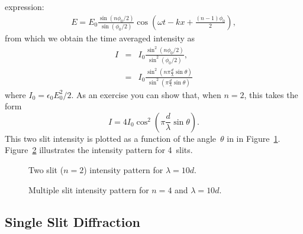 expression:
\begin{eqnarray*}
E = E_0 \frac{\sin (n\phi_0/2)}{\sin (\phi_0/2)}
        \cos\left(\omega t - k x + \frac{(n-1)\phi_0}{2}\right), 
\end{eqnarray*}
from which we obtain the time averaged intensity as
\begin{eqnarray*}
I & = & I_0 \frac{\sin^2 (n\phi_0/2)}{\sin^2 (\phi_0/2)},\\
  & = & I_0 \frac{\sin^2 \left(n \pi \frac{d}{\lambda} \sin \theta\right)}
                 {\sin^2 \left(  \pi \frac{d}{\lambda} \sin \theta\right)}
\end{eqnarray*}
where $I_0 = \epsilon_0 E_0^2/2$. As an exercise you can show that, when $n=2$,
this takes the form
$$I=4I_0\cos^2\left(\pi \frac{d}{\lambda} \sin \theta\right).$$
This two slit intensity is plotted as a function of the angle~$\theta$ in in 
Figure~\ref{fig:diff:2slitint}.  Figure~\ref{fig:diff:n slit intensity} 
illustrates the intensity pattern for 4~slits.
\vfill
\begin{figure}[htb]
\centerline{\epsfxsize=10cm }
\caption{Two slit ($n=2$) intensity pattern for $\lambda=10d$.}
\label{fig:diff:2slitint}
\end{figure}
\begin{figure}[htb]
\centerline{\epsfxsize=10cm }
\caption{Multiple slit intensity pattern for $n=4$ and $\lambda=10d$.}
\label{fig:diff:n slit intensity}
\end{figure}

\subsection{Single Slit Diffraction}
\label{sec:diff:singleslit}

